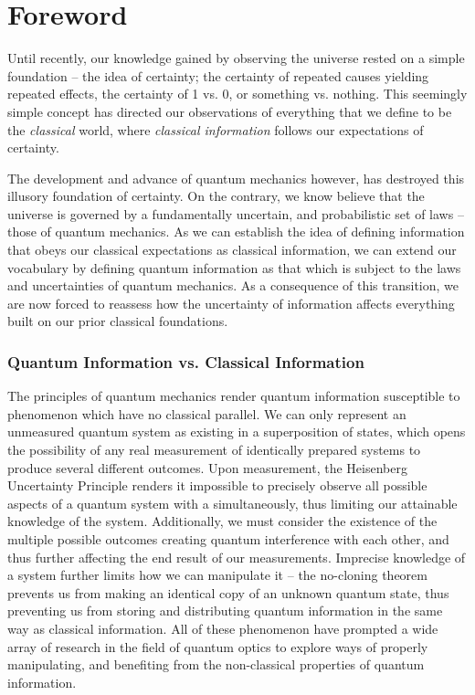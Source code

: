 \chapter*{Foreword}
\label{Foreword} 

Until recently, our knowledge gained by observing the universe rested on a simple foundation -- the idea of certainty; the certainty of repeated causes yielding repeated effects, the certainty of 1 vs. 0, or something vs. nothing.  This seemingly simple concept has directed our observations of everything that we define to be the \emph{classical} world, where \emph{classical information} follows our expectations of certainty.

The development and advance of quantum mechanics however, has destroyed this illusory foundation of certainty.  On the contrary, we know believe that the universe is governed by a fundamentally uncertain, and probabilistic set of laws -- those of quantum mechanics.  As we can establish the idea of defining information that obeys our classical expectations as classical information, we can extend our vocabulary by defining quantum information as that which is subject to the laws and uncertainties of quantum mechanics.  As a consequence of this transition, we are now forced to reassess how the uncertainty of information affects everything built on our prior classical foundations.

\subsection*{Quantum Information vs. Classical Information}
 
The principles of quantum mechanics render quantum information susceptible to phenomenon which have no classical parallel.  We can only represent an unmeasured quantum system as existing in a superposition of states, which opens the possibility of any real measurement of identically prepared systems to produce several different outcomes.  Upon measurement, the Heisenberg Uncertainty Principle renders it impossible to precisely observe all possible aspects of a quantum system with a simultaneously, thus limiting our attainable knowledge of the system.  Additionally, we must consider the existence of the multiple possible outcomes creating quantum interference with each other, and thus further affecting the end result of our measurements.  Imprecise knowledge of a system further limits how we can manipulate it -- the no-cloning theorem prevents us from making an identical copy of an unknown quantum state, thus preventing us from storing and distributing quantum information in the same way as classical information.  All of these phenomenon have prompted a wide array of research in the field of quantum optics to explore ways of properly manipulating, and benefiting from the non-classical properties of quantum information.


